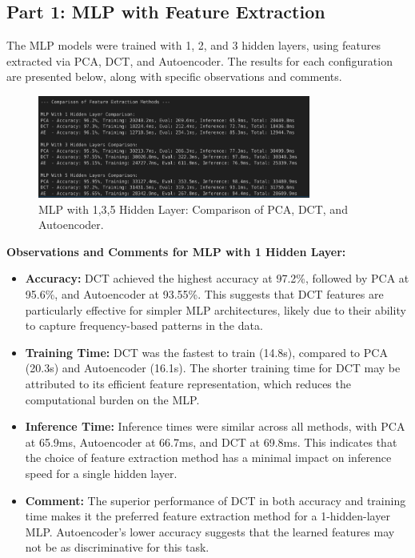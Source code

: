 \documentclass[a4paper,12pt]{article}
\begin{document}
\subsection{Part 1: MLP with Feature Extraction}
The MLP models were trained with 1, 2, and 3 hidden layers, using features extracted via PCA, DCT, and Autoencoder. The results for each configuration are presented below, along with specific observations and comments.

\begin{figure}[H]
    \centering
    \includegraphics[width=0.8\textwidth]{MLPlayers.png}
    \caption{MLP with 1,3,5 Hidden Layer: Comparison of PCA, DCT, and Autoencoder.}
    \label{fig:mlp_1_hidden}
\end{figure}

\textbf{Observations and Comments for MLP with 1 Hidden Layer:}
\begin{itemize}
    \item \textbf{Accuracy:} DCT achieved the highest accuracy at 97.2\%, followed by PCA at 95.6\%, and Autoencoder at 93.55\%. This suggests that DCT features are particularly effective for simpler MLP architectures, likely due to their ability to capture frequency-based patterns in the data.
    \item \textbf{Training Time:} DCT was the fastest to train (14.8s), compared to PCA (20.3s) and Autoencoder (16.1s). The shorter training time for DCT may be attributed to its efficient feature representation, which reduces the computational burden on the MLP.
    \item \textbf{Inference Time:} Inference times were similar across all methods, with PCA at 65.9ms, Autoencoder at 66.7ms, and DCT at 69.8ms. This indicates that the choice of feature extraction method has a minimal impact on inference speed for a single hidden layer.
    \item \textbf{Comment:} The superior performance of DCT in both accuracy and training time makes it the preferred feature extraction method for a 1-hidden-layer MLP. Autoencoder's lower accuracy suggests that the learned features may not be as discriminative for this task.
\end{itemize}
\end{document}
